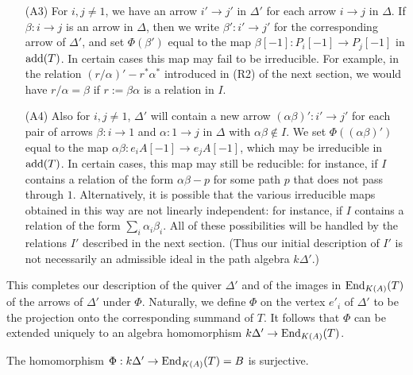 \documentclass{amsart}
\begin{document}
\begin{itemize}
\vspace{2mm}
\item[(A3)] For $i, j \neq 1$, we have an arrow $i' \rightarrow j'$ in $\Delta'$ for each arrow $i \rightarrow j$ in $\Delta$.  If $\beta: i \rightarrow j$ is an arrow in $\Delta$, then we write $\beta' : i' \rightarrow j'$ for the corresponding arrow of $\Delta'$, and set $\Phi(\beta')$ equal to the map  $\beta[-1] : P_i[-1] \rightarrow P_j[-1]$ in $\mathrm{add}(T)$.  In certain cases this map may fail to be irreducible.  For example, in the relation $(r/\alpha)' - r^*\alpha^*$ introduced in (R2) of the next section, we would have $r/\alpha = \beta$ if $r := \beta \alpha$ is a relation in $I$.

\vspace{2mm}
\item[(A4)]  Also for $i,j \neq 1$, $\Delta'$ will contain a new arrow  $(\alpha \beta)' : i' \rightarrow j'$ for each pair of arrows $\beta: i \rightarrow 1$ and $\alpha : 1 \rightarrow j$ in $\Delta$ with $\alpha \beta \notin I$.  We set $\Phi((\alpha \beta)')$ equal to the map $\alpha \beta : e_iA[-1] \rightarrow e_jA[-1]$, which may be irreducible in $\mathrm{add}(T)$.  In certain cases, this map may still be reducible: for instance, if $I$ contains a relation of the form $\alpha \beta - p$ for some path $p$ that does not pass through $1$.  Alternatively, it is possible that the various irreducible maps obtained in this way are not linearly independent: for instance, if $I$ contains a relation of the form $\sum_i \alpha_i\beta_i$.  All of these possibilities will be handled by the relations $I'$ described in the next section.  (Thus our initial description of $I'$ is not necessarily an admissible ideal in the path algebra $k\Delta'$.)

\end{itemize}

This completes our description of the quiver $\Delta'$ and of the images in $\mathrm{End}_{K(A)}(T)$ of the arrows of $\Delta'$ under $\Phi$.  Naturally, we define $\Phi$ on the vertex $e'_i$ of $\Delta'$ to be the projection onto the corresponding summand of $T$.  It follows that $\Phi$ can be extended uniquely to an algebra homomorphism $k\Delta' \rightarrow \mathrm{End}_{K(A)}(T)$.

\begin{propos}  The homomorphism $\Phi : k\Delta' \rightarrow \mathrm{End}_{K(A)}(T) = B$ is surjective.
\end{propos}
\end{document}
